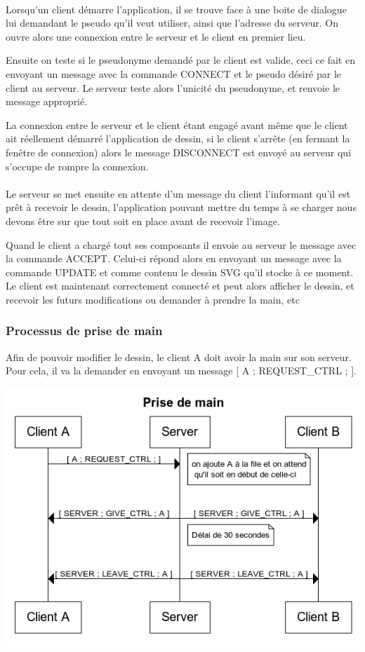 \documentclass[a4paper,11pt]{article}
\begin{document}
\paragraph{}Lorsqu'un client démarre l'application, il se trouve face à une boite de dialogue lui demandant le pseudo qu'il veut utiliser, ainsi que l'adresse du serveur. On ouvre alors une connexion entre le serveur et le client en premier lieu.

Ensuite on teste si le pseudonyme demandé par le client est valide, ceci ce fait en envoyant un message avec la commande CONNECT et le pseudo désiré par le client au serveur. Le serveur teste alors l'unicité du pseudonyme, et renvoie le message approprié.

La connexion entre le serveur et le client étant engagé avant même que le client ait réellement démarré l'application de dessin, si le client s'arrête (en fermant la fenêtre de connexion) alors le message DISCONNECT est envoyé au serveur qui s'occupe de rompre la connexion.


\paragraph{} Le serveur se met ensuite en attente d'un message du client l'informant qu'il est prêt à recevoir le dessin, l'application pouvant mettre du temps à se charger nous devons être sur que tout soit en place avant de recevoir l'image.

Quand le client a chargé tout ses composants il envoie au serveur le message avec la commande ACCEPT. Celui-ci répond alors en envoyant un message avec la commande UPDATE et comme contenu le dessin SVG qu'il stocke à ce moment. Le client est maintenant correctement connecté et peut alors afficher le dessin, et recevoir les futurs modifications ou demander à prendre la main, etc

\subsubsection{Processus de prise de main}
Afin de pouvoir modifier le dessin, le client A doit avoir la main sur son serveur. Pour cela, il va la demander en envoyant un message [ A ; REQUEST\_CTRL ; ].

\includegraphics[scale=1]{image/Prise_de_main.png}
\end{document}
